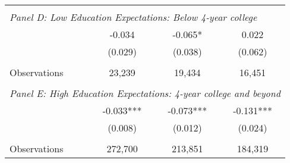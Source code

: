 {\begin{tabular}{lccc}
&  &  &   \\
\multicolumn{4}{l}{\textit{Panel D: Low Education Expectations: Below 4-year college}} \\
\hspace{3mm}        &      -0.034   &      -0.065*  &       0.022   \\
                    &     (0.029)   &     (0.038)   &     (0.062)   \\
                    &               &               &               \\
\hspace{3mm}Observations&      23,239   &      19,434   &      16,451   \\
 
&  &  &   \\
\multicolumn{4}{l}{\textit{Panel E: High Education Expectations: 4-year college and beyond}} \\
\hspace{3mm}        &      -0.033***&      -0.073***&      -0.131***\\
                    &     (0.008)   &     (0.012)   &     (0.024)   \\
                    &               &               &               \\
\hspace{3mm}Observations&     272,700   &     213,851   &     184,319   \\
 

\bottomrule
\end{tabular}
}

